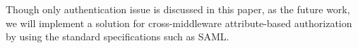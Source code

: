 \documentclass[conference]{IEEEtran}
\begin{document}
Though only authentication issue is discussed in this paper, as the future work, we will implement a solution for cross-middleware attribute-based authorization by using the standard specifications such as SAML.



%
%



%
%
\end{document}
